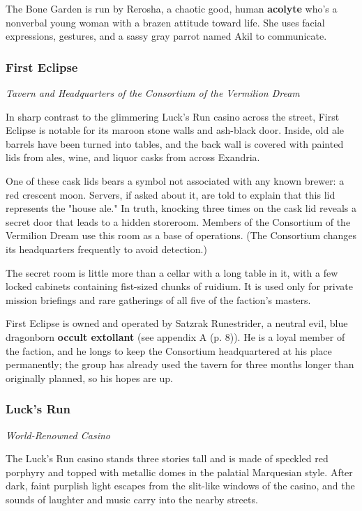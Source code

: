 \documentclass[letterpaper, 11pt, bg=full, twocolumn]{dndbook}
\begin{document}
The Bone Garden is run by Rerosha, a chaotic good, human \textbf{acolyte} who's a nonverbal young woman with a brazen attitude toward life. She uses facial expressions, gestures, and a sassy gray parrot named Akil to communicate.

\subsubsection{First Eclipse}

\textit{Tavern and Headquarters of the Consortium of the Vermilion Dream}

In sharp contrast to the glimmering Luck's Run casino across the street, First Eclipse is notable for its maroon stone walls and ash-black door. Inside, old ale barrels have been turned into tables, and the back wall is covered with painted lids from ales, wine, and liquor casks from across Exandria.

One of these cask lids bears a symbol not associated with any known brewer: a red crescent moon. Servers, if asked about it, are told to explain that this lid represents the "house ale." In truth, knocking three times on the cask lid reveals a secret door that leads to a hidden storeroom. Members of the Consortium of the Vermilion Dream use this room as a base of operations. (The Consortium changes its headquarters frequently to avoid detection.)

The secret room is little more than a cellar with a long table in it, with a few locked cabinets containing fist-sized chunks of ruidium. It is used only for private mission briefings and rare gatherings of all five of the faction's masters.

First Eclipse is owned and operated by Satzrak Runestrider, a neutral evil, blue dragonborn \textbf{occult extollant} (see appendix A (p. 8)). He is a loyal member of the faction, and he longs to keep the Consortium headquartered at his place permanently; the group has already used the tavern for three months longer than originally planned, so his hopes are up.

\subsubsection{Luck's Run}

\textit{World-Renowned Casino}

The Luck's Run casino stands three stories tall and is made of speckled red porphyry and topped with metallic domes in the palatial Marquesian style. After dark, faint purplish light escapes from the slit-like windows of the casino, and the sounds of laughter and music carry into the nearby streets.
\end{document}
